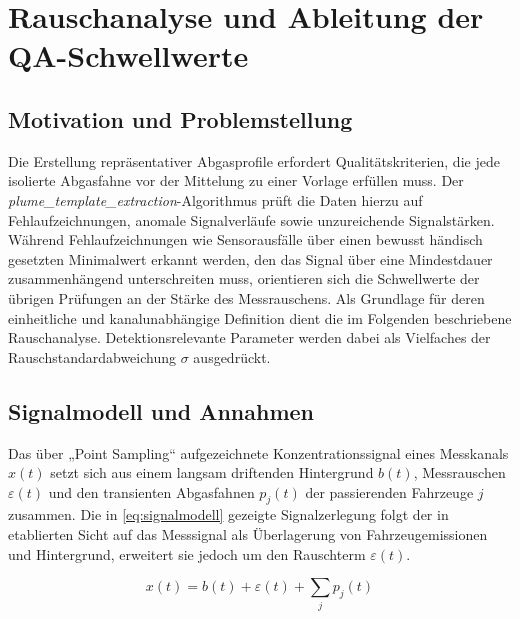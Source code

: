 \section{Rauschanalyse und Ableitung der QA-Schwellwerte}

\subsection{Motivation und Problemstellung}
Die Erstellung repräsentativer Abgasprofile erfordert Qualitätskriterien, die jede isolierte Abgasfahne vor der Mittelung zu einer Vorlage erfüllen muss. Der \textit{plume\_template\_extraction}-Algorithmus prüft die Daten hierzu auf Fehlaufzeichnungen, anomale Signalverläufe sowie unzureichende Signalstärken. Während Fehlaufzeichnungen wie Sensorausfälle über einen bewusst händisch gesetzten Minimalwert erkannt werden, den das Signal über eine Mindestdauer zusammenhängend unterschreiten muss, orientieren sich die Schwellwerte der übrigen Prüfungen an der Stärke des Messrauschens. Als Grundlage für deren einheitliche und kanalunabhängige Definition dient die im Folgenden beschriebene Rauschanalyse. Detektionsrelevante Parameter werden dabei als Vielfaches der Rauschstandardabweichung $\sigma$ ausgedrückt.

\subsection{Signalmodell und Annahmen}
Das über „Point Sampling“ aufgezeichnete Konzentrationssignal eines Messkanals $x(t)$ setzt sich aus einem langsam driftenden Hintergrund $b(t)$, Messrauschen $\varepsilon(t)$ und den transienten Abgasfahnen $p_j(t)$ der passierenden Fahrzeuge $j$ zusammen. Die in \eqref{eq:signalmodell} gezeigte Signalzerlegung folgt der in \cite{knollLargescaleAutomatedEmission2024} etablierten Sicht auf das Messsignal als Überlagerung von Fahrzeugemissionen und Hintergrund, erweitert sie jedoch um den Rauschterm $\varepsilon(t)$. 

\begin{equation}
    x(t) = b(t)+ \varepsilon(t)+\sum_{j}p_{j}(t)
\label{eq:signalmodell}
\end{equation}

